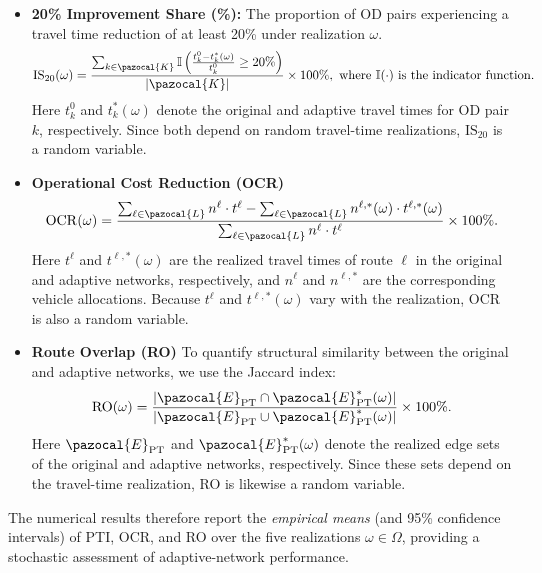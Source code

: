 \documentclass[a4paper,fleqn]{cas-sc}
\begin{document}
\begin{itemize}
    \item \textbf{20\% Improvement Share (\%):} The proportion of OD pairs experiencing a travel time reduction of at least 20\% under realization $\omega$.
    \begin{align}
        \text{IS$_{20}$}(\omega) = \frac{\sum_{k \in \pazocal{K}} \mathbb{I} \left( \frac{t_k^0 - t_k^*(\omega)}{t_k^0} \geq 20\% \right)}{|\pazocal{K}|} \times 100\%, \text{ where } \mathbb{I}(\cdot) \text{ is the indicator function.}\nonumber
    \end{align}
    Here $t_k^0$ and $t_k^*(\omega)$ denote the original and adaptive travel times for OD pair $k$, respectively. Since both depend on random travel-time realizations, $\text{IS$_{20}$}$ is a random variable.
    
    \item \textbf{Operational Cost Reduction (OCR)}  
        \[
            \mathrm{OCR}(\omega)
            =
            \frac{\sum_{\ell \in \pazocal{L}} n^\ell \cdot t^\ell
                  -
                  \sum_{\ell \in \pazocal{L}} n^{\ell,*}(\omega) \cdot t^{\ell,*}(\omega)}
                 {\sum_{\ell \in \pazocal{L}} n^\ell \cdot t^\ell}
            \times 100\%.
        \]
    Here  
    $t^\ell$ and $t^{\ell,*}(\omega)$ are the realized travel times of route $\ell$ in the original and adaptive networks, respectively,  
    and  
    $n^\ell$ and $n^{\ell,*}$ are the corresponding vehicle allocations.  
    Because $t^\ell$ and $t^{\ell,*}(\omega)$ vary with the realization, OCR is also a random variable.
    
    \item \textbf{Route Overlap (RO)}  
    To quantify structural similarity between the original and adaptive networks, we use the Jaccard index:
    \[
        \mathrm{RO}(\omega)
        =
        \frac{\lvert \pazocal{E}_{\mathrm{PT}}
                 \cap
                 \pazocal{E}_{\mathrm{PT}}^*(\omega)\rvert}
             {\lvert \pazocal{E}_{\mathrm{PT}}
                 \cup
                 \pazocal{E}_{\mathrm{PT}}^*(\omega)\rvert}
        \times 100\%.
    \]
    Here $\pazocal{E}_{\mathrm{PT}}$ and $\pazocal{E}_{\mathrm{PT}}^*(\omega)$ denote the realized edge sets of the original and adaptive networks, respectively.  
    Since these sets depend on the travel-time realization, RO is likewise a random variable.

\end{itemize}

The numerical results therefore report the \emph{empirical means} (and 95\% confidence intervals) of PTI, OCR, and RO over the five realizations $\omega \in \Omega$, providing a stochastic assessment of adaptive-network performance.

\end{document}
